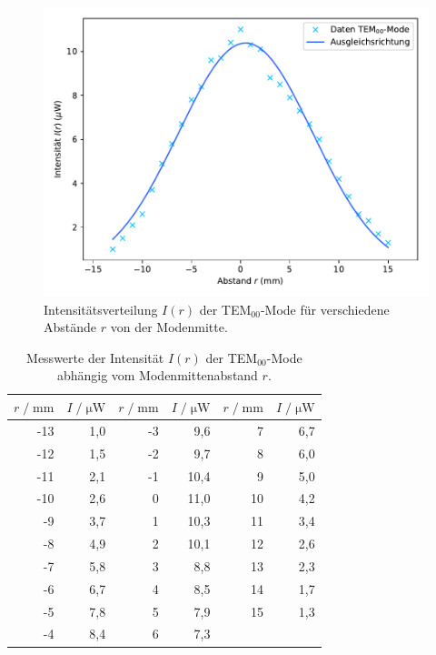 \begin{figure}[H]
    \centering
    \includegraphics[scale=0.7]{content/TEM00.pdf}
    \vspace{-10pt}
    \caption{Intensitätsverteilung $I(r)$ der TEM$_{00}$-Mode für verschiedene Abstände $r$ von der Modenmitte.}
    \label{fig:TEM00}
\end{figure}

\begin{table}[H]
    \centering
    \caption{Messwerte der Intensität $I(r)$ der TEM$_{00}$-Mode abhängig vom Modenmittenabstand $r$.}
    \label{tab:TEM00}
    \begin{tabular}{r r | r r | r r}
    \toprule
    $r \;/\; \si{\milli\meter}$ & $I \;/\; \si{\micro\watt}$ & $r \;/\; \si{\milli\meter}$ & $I \;/\; \si{\micro\watt}$
    & $r \;/\; \si{\milli\meter}$ & $I \;/\; \si{\micro\watt}$ \\
    \midrule
        -13 & 1,0 & -3 &  9,6 &  7 & 6,7 \\
        -12 & 1,5 & -2 &  9,7 &  8 & 6,0 \\
        -11 & 2,1 & -1 & 10,4 &  9 & 5,0 \\
        -10 & 2,6 &  0 & 11,0 & 10 & 4,2 \\
         -9 & 3,7 &  1 & 10,3 & 11 & 3,4 \\
         -8 & 4,9 &  2 & 10,1 & 12 & 2,6 \\
         -7 & 5,8 &  3 &  8,8 & 13 & 2,3 \\
         -6 & 6,7 &  4 &  8,5 & 14 & 1,7 \\
         -5 & 7,8 &  5 &  7,9 & 15 & 1,3 \\
         -4 & 8,4 &  6 &  7,3 \\
    \bottomrule
    \end{tabular}
\end{table}

